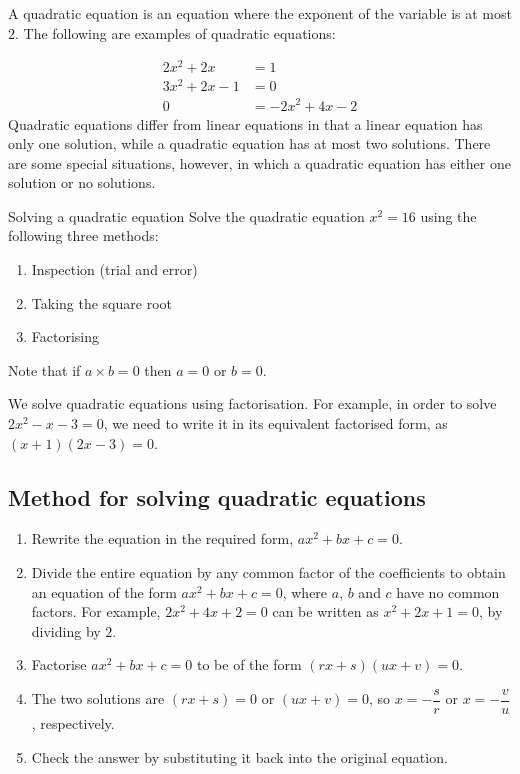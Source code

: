 A quadratic equation is an equation where the exponent of the variable is at most
$2$. The following are examples of quadratic equations:

\begin{align*}
  2{x}^{2}+2x &= 1 \\
  3{x}^{2}+2x-1 &= 0 \\ 
  0 &= -2{x}^{2}+4x-2
\end{align*}
Quadratic equations differ from linear equations in that a linear
equation has only one solution, while a quadratic equation has at most
two solutions. There are some special situations, however, in which a
quadratic equation has either one solution or no solutions.

\begin{activity}{Solving a quadratic equation}
Solve the quadratic equation $x^{2}=16$ using the following three methods:
\begin{enumerate}[noitemsep, label=\textbf{\arabic*}. ] 
\item Inspection (trial and error)
\item Taking the square root
\item Factorising
\end{enumerate}
Note that if $a \times b = 0$ then $a = 0$ or $b=0$.
\end{activity}

We solve quadratic equations using factorisation. For example, in order
to solve $2{x}^{2}-x-3 = 0$, we need to write it in its equivalent
factorised form, as $(x+1)(2x-3)=0$.

\subsection*{Method for solving quadratic equations}
\begin{enumerate}[noitemsep, label=\textbf{\arabic*}. ] 
\item Rewrite the equation in the required form, $ax^{2} +bx +c =0$.
\item Divide the entire equation by any common factor of the coefficients
to obtain an equation of the form $a{x}^{2}+bx+c=0$, where $a$, $b$ and
$c$ have no common factors. For example, $2{x}^{2}+4x+2=0$ can be written as
${x}^{2}+2x+1=0$, by dividing by $2$.
\item Factorise $a{x}^{2}+bx+c=0$ to be of the form $(rx+s)(ux+v)=0$.
\item The two solutions are $(rx+s)=0$ or $(ux+v)=0$, so $x = -\dfrac{s}{r}$ or $x=-\dfrac{v}{u}$, respectively.
\item Check the answer by substituting it back into the original equation.
\end{enumerate}

